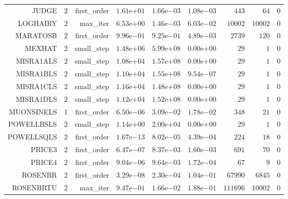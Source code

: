 \begin{longtable}{rrrrrrrrr}
JUDGE & \(     2\) & first\_order & \( 1.61\)e\(+01\) & \( 1.66\)e\(-03\) & \( 1.08\)e\(-03\) & \(   443\) & \(    64\) & \(     0\) \\
LOGHAIRY & \(     2\) & max\_iter & \( 6.53\)e\(+00\) & \( 1.46\)e\(-03\) & \( 6.03\)e\(-02\) & \( 10002\) & \( 10002\) & \(     0\) \\
MARATOSB & \(     2\) & first\_order & \( 9.96\)e\(-01\) & \( 9.25\)e\(-01\) & \( 4.89\)e\(-03\) & \(  2739\) & \(   120\) & \(     0\) \\
MEXHAT & \(     2\) & small\_step & \( 1.48\)e\(+06\) & \( 5.99\)e\(+08\) & \( 0.00\)e\(+00\) & \(    29\) & \(     1\) & \(     0\) \\
MISRA1ALS & \(     2\) & small\_step & \( 1.08\)e\(+04\) & \( 1.57\)e\(+08\) & \( 0.00\)e\(+00\) & \(    29\) & \(     1\) & \(     0\) \\
MISRA1BLS & \(     2\) & small\_step & \( 1.10\)e\(+04\) & \( 1.55\)e\(+08\) & \( 9.54\)e\(-07\) & \(    29\) & \(     1\) & \(     0\) \\
MISRA1CLS & \(     2\) & small\_step & \( 1.16\)e\(+04\) & \( 1.48\)e\(+08\) & \( 0.00\)e\(+00\) & \(    29\) & \(     1\) & \(     0\) \\
MISRA1DLS & \(     2\) & small\_step & \( 1.12\)e\(+04\) & \( 1.52\)e\(+08\) & \( 0.00\)e\(+00\) & \(    29\) & \(     1\) & \(     0\) \\
MUONSINELS & \(     1\) & first\_order & \( 6.50\)e\(-06\) & \( 3.09\)e\(-02\) & \( 1.78\)e\(-02\) & \(   348\) & \(    21\) & \(     0\) \\
POWELLBSLS & \(     2\) & small\_step & \( 1.14\)e\(+00\) & \( 2.00\)e\(+04\) & \( 0.00\)e\(+00\) & \(    29\) & \(     1\) & \(     0\) \\
POWELLSQLS & \(     2\) & first\_order & \( 1.67\)e\(-13\) & \( 8.02\)e\(-05\) & \( 4.39\)e\(-04\) & \(   224\) & \(    18\) & \(     0\) \\
PRICE3 & \(     2\) & first\_order & \( 6.47\)e\(-07\) & \( 8.37\)e\(-03\) & \( 1.60\)e\(-03\) & \(   691\) & \(    70\) & \(     0\) \\
PRICE4 & \(     2\) & first\_order & \( 9.04\)e\(-06\) & \( 9.64\)e\(-03\) & \( 1.72\)e\(-04\) & \(    67\) & \(     9\) & \(     0\) \\
ROSENBR & \(     2\) & first\_order & \( 3.29\)e\(-08\) & \( 2.30\)e\(-04\) & \( 1.04\)e\(-01\) & \( 67990\) & \(  6845\) & \(     0\) \\
ROSENBRTU & \(     2\) & max\_iter & \( 9.47\)e\(-01\) & \( 1.66\)e\(-02\) & \( 1.88\)e\(-01\) & \(111696\) & \( 10002\) & \(     0\) \\

\end{longtable}
